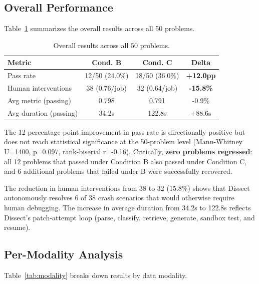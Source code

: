 \documentclass[conference]{IEEEtran}
\begin{document}
\subsection{Overall Performance}

Table~\ref{tab:overall} summarizes the overall results across all 50 problems.

\begin{table}[ht]
  \centering
  \small
  \caption{Overall results across all 50 problems.}
  \label{tab:overall}
  \begin{tabular}{lccc}
  \toprule
  \textbf{Metric} & \textbf{Cond. B} & \textbf{Cond. C} & \textbf{Delta} \\
  \midrule
  Pass rate & 12/50 (24.0\%) & 18/50 (36.0\%) & \textbf{+12.0pp} \\
  Human interventions & 38 (0.76/job) & 32 (0.64/job) & \textbf{-15.8\%} \\
  Avg metric (passing) & 0.798 & 0.791 & -0.9\% \\
  Avg duration (passing) & 34.2s & 122.8s & +88.6s \\
  \bottomrule
  \end{tabular}
\end{table}

The 12 percentage-point improvement in pass rate is directionally positive but does not
reach statistical significance at the 50-problem level (Mann-Whitney U=1400, p=0.097,
rank-biserial r=-0.16). Critically, \textbf{zero problems regressed}: all 12 problems
that passed under Condition B also passed under Condition C, and 6 additional problems
that failed under B were successfully recovered.

The reduction in human interventions from 38 to 32 (15.8\%) shows that Dissect
autonomously resolves 6 of 38 crash scenarios that would otherwise require human
debugging. The increase in average duration from 34.2s to 122.8s reflects Dissect's
patch-attempt loop (parse, classify, retrieve, generate, sandbox test, and resume).

\subsection{Per-Modality Analysis}

Table~\ref{tab:modality} breaks down results by data modality.
\end{document}
